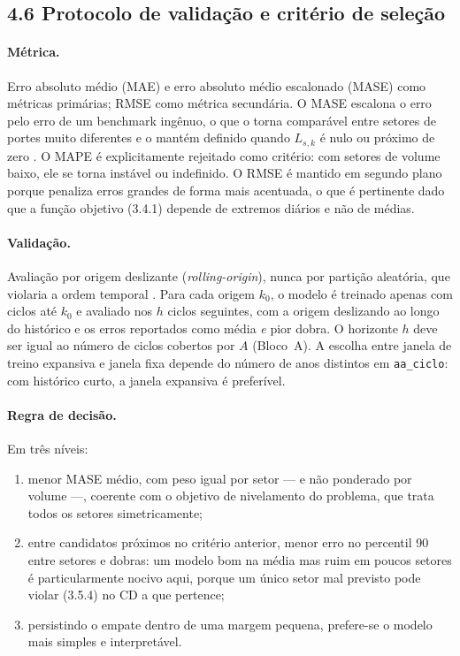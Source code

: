 \documentclass[11pt]{article}
\begin{document}
\subsection*{4.6 Protocolo de validação e critério de seleção}

\paragraph{Métrica.} Erro absoluto médio (MAE) e erro absoluto médio
escalonado (MASE) como métricas primárias; RMSE como métrica secundária.
O MASE escalona o erro pelo erro de um benchmark ingênuo, o que o torna
comparável entre setores de portes muito diferentes e o mantém definido
quando $L_{s,k}$ é nulo ou próximo de zero \cite{hyndmanforesight}. O MAPE
é explicitamente rejeitado como critério: com setores de volume baixo, ele
se torna instável ou indefinido. O RMSE é mantido em segundo plano porque
penaliza erros grandes de forma mais acentuada, o que é pertinente dado
que a função objetivo (3.4.1) depende de extremos diários e não de médias.

\paragraph{Validação.} Avaliação por origem deslizante
(\emph{rolling-origin}), nunca por partição aleatória, que violaria a
ordem temporal \cite{fpp3cv}. Para cada origem $k_0$, o modelo é treinado
apenas com ciclos até $k_0$ e avaliado nos $h$ ciclos seguintes, com a
origem deslizando ao longo do histórico e os erros reportados como média
\emph{e} pior dobra. O horizonte $h$ deve ser igual ao número de ciclos
cobertos por $A$ (Bloco~A). A escolha entre janela de treino expansiva e
janela fixa depende do número de anos distintos em \texttt{aa\_ciclo}:
com histórico curto, a janela expansiva é preferível.

\paragraph{Regra de decisão.} Em três níveis:
\begin{enumerate}
  \item menor MASE médio, com peso igual por setor --- e não ponderado por
    volume ---, coerente com o objetivo de nivelamento do problema, que
    trata todos os setores simetricamente;
  \item entre candidatos próximos no critério anterior, menor erro no
    percentil 90 entre setores e dobras: um modelo bom na média mas
    ruim em poucos setores é particularmente nocivo aqui, porque um único
    setor mal previsto pode violar (3.5.4) no CD a que pertence;
  \item persistindo o empate dentro de uma margem pequena, prefere-se o
    modelo mais simples e interpretável.
\end{enumerate}
\end{document}
